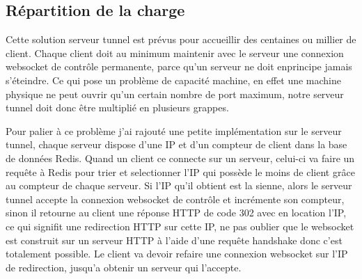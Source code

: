 \subsection{Répartition de la charge}

Cette solution serveur tunnel est prévus pour accueillir des centaines ou millier de client. Chaque client doit au minimum maintenir avec le serveur une connexion websocket de contrôle permanente, parce qu'un serveur ne doit enprincipe jamais s'éteindre. Ce qui pose un problème de capacité machine, en effet une machine physique ne peut ouvrir qu'un certain nombre de port maximum, notre serveur tunnel doit donc être multiplié en plusieurs grappes.

Pour palier à ce problème j'ai rajouté une petite implémentation sur le serveur tunnel, chaque serveur dispose d'une IP et d'un compteur de client dans la base de données Redis. Quand un client ce connecte sur un serveur, celui-ci va faire un requête à Redis pour trier et selectionner l'IP qui possède le moins de client grâce au compteur de chaque serveur. Si l'IP qu'il obtient est la sienne, alors le serveur tunnel accepte la connexion websocket de contrôle et incrémente son compteur, sinon il retourne au client une réponse HTTP de code 302 avec en location l'IP, ce qui signifit une redirection HTTP sur cette IP, ne pas oublier que le websocket est construit sur un serveur HTTP à l'aide d'une requête handshake donc c'est totalement possible. Le client va devoir refaire une connexion websocket sur l'IP de redirection, jusqu'a obtenir un serveur qui l'accepte.

